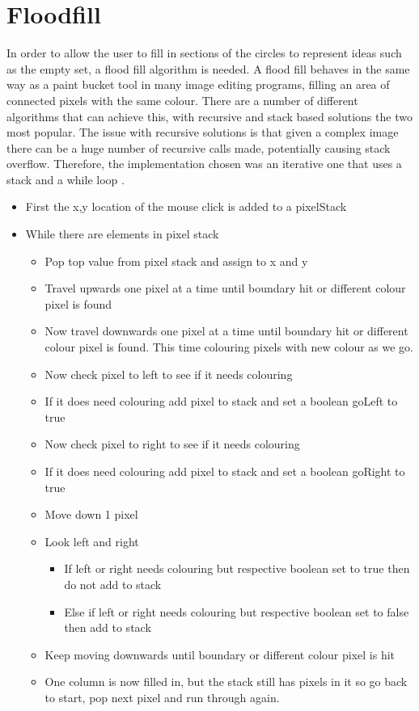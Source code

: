 \documentclass[12pt,a4paper]{report}
\begin{document}
\section{Floodfill}
In order to allow the user to fill in sections of the circles to represent ideas such as the empty set, a flood fill algorithm is needed. A flood fill behaves in the same way as a paint bucket tool in many image editing programs, filling an area of connected pixels with the same colour. There are a number of different algorithms that can achieve this, with recursive and stack based solutions the two most popular. The issue with recursive solutions is that given a complex image there can be a huge number of recursive calls made, potentially causing stack overflow. 
Therefore, the implementation chosen was an iterative one that uses a stack and a while loop \citep{mallone}.
\newpage
\begin{itemize}
   \item  First the x,y location of the mouse click is added to a pixelStack
   \item While there are elements in pixel stack
   \begin{itemize}
     \item  Pop top value from pixel stack and assign to x and y
\item  Travel upwards one pixel at a time until boundary hit or different colour pixel is found
\item  Now travel downwards one pixel at a time until boundary hit or different colour pixel is found. This time colouring pixels with new colour as we go.

\item  Now check pixel to left to see if it needs colouring
\item  If it does need colouring add pixel to stack and set a boolean goLeft to true

\item  Now check pixel to right to see if it needs colouring

\item  If it does need colouring add pixel to stack and set a boolean goRight to true

\item  Move down 1 pixel

\item  Look left and right

     \begin{itemize}
       \item  If left or right needs colouring but respective boolean set to true then do not add to stack
\item Else if left or right needs colouring but respective boolean set to false then add to stack
     \end{itemize}
     \item Keep moving downwards until boundary or different colour pixel is hit
\item One column is now filled in, but the stack still has pixels in it so go back to start, pop next pixel and run through again.

   \end{itemize}
 \end{itemize}
	
\end{document}
